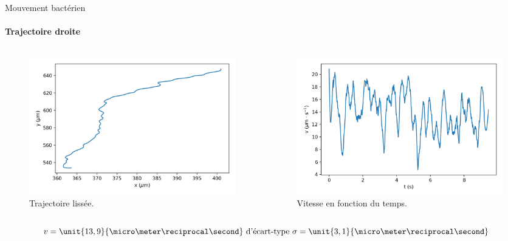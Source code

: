 \documentclass[11pt]{beamer}
\begin{document}
\begin{frame}{Mouvement bactérien}
\framesubtitle{Trajectoire droite}

\begin{columns}
\begin{figure}
\centering
\includegraphics[width=1\linewidth]{traj_lissee.png}
\caption{Trajectoire lissée.}
\end{figure}

\begin{figure}
\centering
\includegraphics[width=0.82\linewidth]{vitesse_v_1.png}
\caption{Vitesse en fonction du temps.}
\label{fig:my_label}
\end{figure}
\end{columns}
\begin{equation*}
v = \unit{13,9}{\micro\meter\reciprocal\second} \text{ d'écart-type } \sigma = \unit{3,1}{\micro \meter\reciprocal\second}
\end{equation*}


\end{frame}
\end{document}
